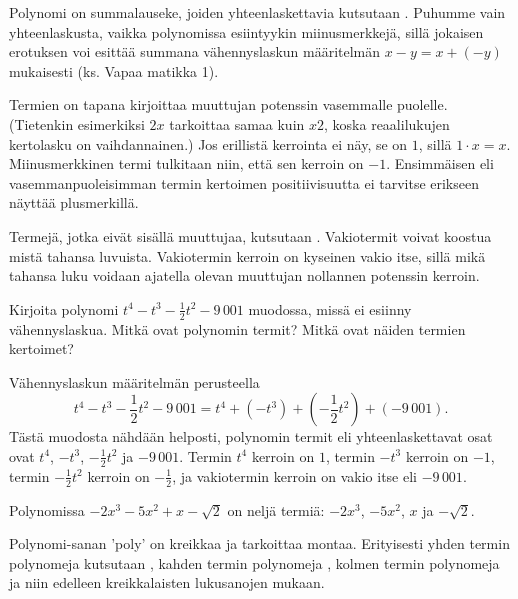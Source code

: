 Polynomi on summalauseke, joiden yhteenlaskettavia kutsutaan . Puhumme vain yhteenlaskusta, vaikka polynomissa esiintyykin miinusmerkkejä, sillä jokaisen erotuksen voi esittää summana vähennyslaskun määritelmän $x-y=x+(-y)$ mukaisesti (ks. Vapaa matikka 1).

Termien  on tapana kirjoittaa muuttujan potenssin vasemmalle puolelle. (Tietenkin esimerkiksi $2x$ tarkoittaa samaa kuin $x2$, koska reaalilukujen kertolasku on vaihdannainen.) Jos erillistä kerrointa ei näy, se on $1$, sillä $1\cdot x=x$. Miinusmerkkinen termi tulkitaan niin, että sen kerroin on $-1$. Ensimmäisen eli vasemmanpuoleisimman termin kertoimen positiivisuutta ei tarvitse erikseen näyttää plusmerkillä.

Termejä, jotka eivät sisällä muuttujaa, kutsutaan . Vakiotermit voivat koostua mistä tahansa luvuista. Vakiotermin kerroin on kyseinen vakio itse, sillä mikä tahansa luku voidaan ajatella olevan muuttujan nollannen potenssin kerroin.

\begin{esimerkki}
Kirjoita polynomi $t^4-t^3-\frac{1}{2}t^2-9\,001$ muodossa, missä ei esiinny vähennyslaskua. Mitkä ovat polynomin termit? Mitkä ovat näiden termien kertoimet? 

	\begin{esimratk}
Vähennyslaskun määritelmän perusteella $$t^4-t^3-\frac{1}{2}t^2-9\,001 = t^4+(-t^3)+(-\frac{1}{2}t^2)+(-9\,001).$$ Tästä muodosta nähdään helposti, polynomin termit eli yhteenlaskettavat osat ovat $t^4$, $-t^3$, $-\frac{1}{2}t^2$ ja $-9\,001$. Termin $t^4$ kerroin on $1$, termin $-t^3$ kerroin on $-1$, termin $-\frac{1}{2}t^2$ kerroin on $-\frac{1}{2}$, ja vakiotermin kerroin on vakio itse eli $-9\,001$.
	\end{esimratk}
\end{esimerkki}

\begin{esimerkki}
Polynomissa $-2x^3-5x^2+x-\sqrt{2}$ on neljä termiä: $-2x^3$, $-5x^2$, $x$ ja $-\sqrt{2}$.
\end{esimerkki}

Polynomi-sanan 'poly' on kreikkaa ja tarkoittaa montaa. Erityisesti yhden termin polynomeja kutsutaan , kahden termin polynomeja , kolmen termin polynomeja  ja niin edelleen kreikkalaisten lukusanojen mukaan. %

